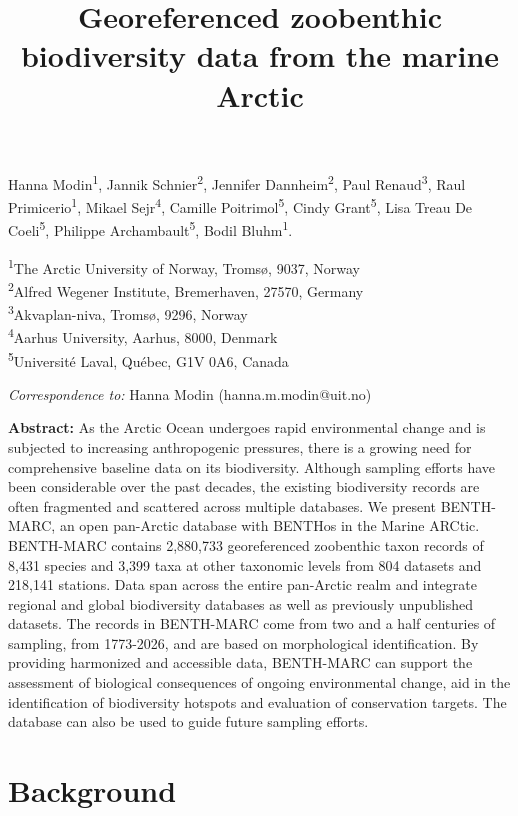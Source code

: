 \documentclass[
  letterpaper,
  DIV=11,
  numbers=noendperiod]{scrartcl}
\title{Georeferenced zoobenthic biodiversity data from the marine
Arctic}
\author{}
\date{}
\begin{document}
\maketitle


Hanna Modin\textsuperscript{1}, Jannik Schnier\textsuperscript{2},
Jennifer Dannheim\textsuperscript{2}, Paul Renaud\textsuperscript{3},
Raul Primicerio\textsuperscript{1}, Mikael Sejr\textsuperscript{4},
Camille Poitrimol\textsuperscript{5}, Cindy Grant\textsuperscript{5},
Lisa Treau De Coeli\textsuperscript{5}, Philippe
Archambault\textsuperscript{5}, Bodil Bluhm\textsuperscript{1}.

\textsuperscript{1}The Arctic University of Norway, Tromsø, 9037,
Norway\\
\textsuperscript{2}Alfred Wegener Institute, Bremerhaven, 27570,
Germany\\
\textsuperscript{3}Akvaplan-niva, Tromsø, 9296, Norway\\
\textsuperscript{4}Aarhus University, Aarhus, 8000, Denmark\\
\textsuperscript{5}Université Laval, Québec, G1V 0A6, Canada

\emph{Correspondence to:} Hanna Modin (hanna.m.modin@uit.no)

\textbf{Abstract:} As the Arctic Ocean undergoes rapid environmental
change and is subjected to increasing anthropogenic pressures, there is
a growing need for comprehensive baseline data on its biodiversity.
Although sampling efforts have been considerable over the past decades,
the existing biodiversity records are often fragmented and scattered
across multiple databases. We present BENTH-MARC, an open pan-Arctic
database with BENTHos in the Marine ARCtic. BENTH-MARC contains
2,880,733 georeferenced zoobenthic taxon records of 8,431 species and
3,399 taxa at other taxonomic levels from 804 datasets and 218,141
stations. Data span across the entire pan-Arctic realm and integrate
regional and global biodiversity databases as well as previously
unpublished datasets. The records in BENTH-MARC come from two and a half
centuries of sampling, from 1773-2026, and are based on morphological
identification. By providing harmonized and accessible data, BENTH-MARC
can support the assessment of biological consequences of ongoing
environmental change, aid in the identification of biodiversity hotspots
and evaluation of conservation targets. The database can also be used to
guide future sampling efforts.

\section{Background}\label{background}
\end{document}
